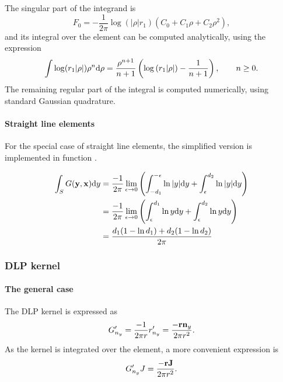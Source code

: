 The singular part of the integrand is
%
\begin{equation}
	F_0 = -\frac{1}{2\pi} \log \left(|\rho| r_1\right) \left( C_0 + C_1 \rho + C_2 \rho^2 \right)
	,
\end{equation}
%
and its integral over the element can be computed analytically, using the expression
%
\begin{equation}
	\int \log(r_1 |\rho|) \rho^n \mathrm{d} \rho = \frac{\rho^{n+1}}{n+1} \left( \log\left(r_1 |\rho|\right) - \frac{1}{n+1} \right)
	, \qquad n \ge 0
	.
\end{equation}
%
The remaining regular part of the integral is computed numerically, using standard Gaussian quadrature.


\paragraph{Straight line elements}

For the special case of straight line elements, the simplified version is implemented in function .


\begin{align}
\int_{S} G({\bf y}, {\bf x}) \mathrm{d} y
& = \frac{-1}{2\pi}\lim_{\epsilon \to 0}
\left( \int_{-d_1}^{-\epsilon} \ln |y| \mathrm{d} y + \int_{\epsilon}^{d_2}  \ln |y| \mathrm{d} y \right) \nonumber \\
& = \frac{-1}{2\pi}\lim_{\epsilon \to 0}
\left( \int_{\epsilon}^{d_1} \ln y \mathrm{d} y + \int_{\epsilon}^{d_2}  \ln y \mathrm{d} y \right) \nonumber \\
&=
\frac{d_1(1-\ln d_1) + d_2(1-\ln d_2)}{2\pi}
\end{align}



\subsubsection{DLP kernel}

\paragraph{The general case}

The DLP kernel is expressed as
%
\begin{equation}
	G'_{n_y} = \frac{-1}{2\pi r} r'_{n_y}
	= \frac{-{\bf r} {\bf n}_y}{2\pi r^2} 
	.
\end{equation}
%
As the kernel is integrated over the element, a more convenient expression is
%
\begin{equation}
	G'_{n_y} J = \frac{-{\bf r} {\bf J}}{2\pi r^2} 
	.
\end{equation}

